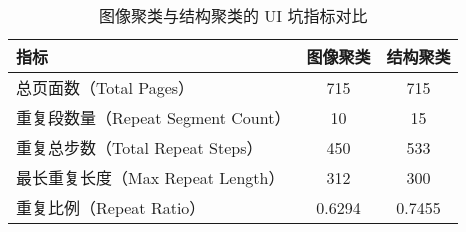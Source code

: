 \begin{table}[htbp]
\centering
\caption{图像聚类与结构聚类的 UI 坑指标对比}
\begin{tabular}{lcc}
\toprule
\textbf{指标} & \textbf{图像聚类} & \textbf{结构聚类} \\
\midrule
总页面数（Total Pages） & 715 & 715 \\
重复段数量（Repeat Segment Count） & 10 & 15 \\
重复总步数（Total Repeat Steps） & 450 & 533 \\
最长重复长度（Max Repeat Length） & 312 & 300 \\
重复比例（Repeat Ratio） & 0.6294 & 0.7455 \\
\bottomrule
\end{tabular}
\label{tab:ui_tarpit_comparison}
\end{table}
